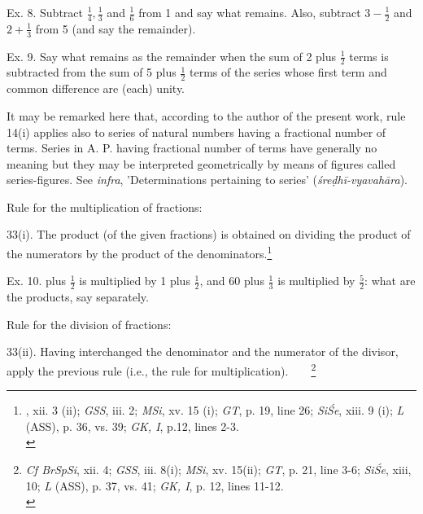 \documentclass[10pt, openany]{book}
\begin{document}
{{{{{{{{{{{{{{{{{{{{\begin{sloppypar}
 Ex. 8. Subtract $\frac{1}{4}, \frac{1}{3}$ and $\frac{1}{6}$ from 1 and say what remains.
Also, subtract $3 - \frac{1}{2}$ and $2 + \frac{1}{3}$ from 5 (and say the remainder).
\vspace{3mm}

 Ex. 9. Say what remains as the remainder when the
sum of 2 plus $\frac{1}{2}$ terms is subtracted from the sum of 5 plus $\frac{1}{2}$
terms of the series whose first term and common difference are
(each) unity.
\vspace{3mm}

{\small It may be remarked here that, according to the author of the
present work, rule 14(i) applies also to series of natural numbers
having a fractional number of terms. Series in A. P. having fractional number of terms have generally no meaning but they may be
interpreted geometrically by means of figures called series-figures.
See \textit{infra}, 'Determinations pertaining to series'
(\textit{śreḍhī-vyavahāra}).}


\end{sloppypar}

\newpage

\begin{sloppypar}

\noindent Rule for the multiplication of fractions:
\vspace{3mm}

 33(i). The product (of the given fractions) is obtained on
dividing the product of the numerators by the product of the
denominators.\renewcommand{\thefootnote}{1}\footnote{\hspace{-2mm} , xii. 3 (ii);  \textit{GSS}, iii. 2;  \textit{MSi}, xv. 15 (i); \textit{GT}, p. 19,
line 26;  \textit{SiŚe}, xiii. 9 (i);  \textit{L} (ASS), p. 36, vs. 39;  \textit{GK, I}, p.12, lines 2-3.\\}
\vspace{3mm}

Ex. 10.  plus $\frac{1}{2}$ is multiplied by 1 plus $\frac{1}{2}$, and 60 plus $\frac{1}{3}$
is multiplied by $\frac{5}{2}$: what are the products, say separately.
\vspace{4mm}

\noindent Rule for the division of fractions:
\vspace{3mm}

 33(ii). Having interchanged the denominator and the
numerator of the divisor, apply the previous rule (i.e., the
rule for multiplication).~~~~\renewcommand{\thefootnote}{\hspace{-4.5mm} 2}\footnote{\hspace{-2mm} \en \textit{Cf BrSpSi}, xii. 4; \textit{GSS}, iii. 8(i);  \textit{MSi}, xv. 15(ii); \textit{GT}, p. 21, line 3-6;  \textit{SiŚe}, xiii, 10; \textit{L} (ASS), p. 37, vs. 41;  \textit{GK, I}, p. 12, lines 11-12.\\}
\vspace{3mm}


\end{sloppypar}}}}}}}}}}}}}}}}}}}}}
\end{document}
